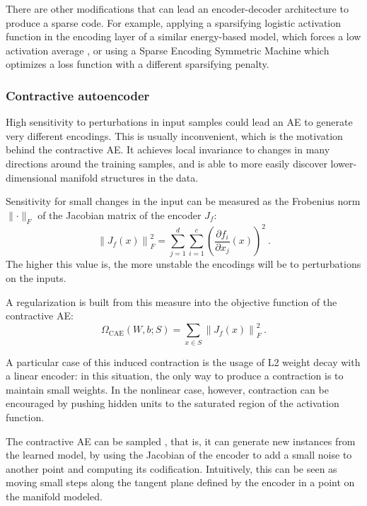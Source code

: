 There are other modifications that can lead an encoder-decoder architecture to produce a sparse code. For example, applying a sparsifying logistic activation function in the encoding layer of a similar energy-based model, which forces a low activation average \cite{SparsifyingLogistic}, or using a Sparse Encoding Symmetric Machine \cite{SESM} which optimizes a loss function with a different sparsifying penalty.

\subsubsection{Contractive autoencoder}

High sensitivity to perturbations in input samples could lead an AE to generate very different encodings. This is usually inconvenient, which is the motivation behind the contractive AE. It achieves local invariance to changes in many directions around the training samples, and is able to more easily discover lower-dimensional manifold structures in the data.

Sensitivity for small changes in the input can be measured as the Frobenius norm $\lVert\cdot\rVert_F$ of the Jacobian matrix of the encoder $J_f$:
\begin{equation}
  \left\lVert J_f(x) \right\rVert_F^2=
  \sum_{j=1}^d\sum_{i=1}^c \left(\frac{\partial f_i}{\partial x_j}\left(x\right)\right)^2~.
\end{equation}
The higher this value is, the more unstable the encodings will be to perturbations on the inputs.

A regularization is built from this measure into the objective function of the contractive AE:
\begin{equation}
  \Omega_{\mathrm{CAE}}(W,b;S) = \sum_{x\in S}\left\lVert J_f(x) \right\rVert_F^2~.
\end{equation}

A particular case of this induced contraction is the usage of L2 weight decay with a linear encoder: in this situation, the only way to produce a contraction is to maintain small weights. In the nonlinear case, however, contraction can be encouraged by pushing hidden units to the saturated region of the activation function.

The contractive AE can be sampled \cite{generativeCAE}, that is, it can generate new instances from the learned model, by using the Jacobian of the encoder to add a small noise to another point and computing its codification. Intuitively, this can be seen as moving small steps along the tangent plane defined by the encoder in a point on the manifold modeled.


